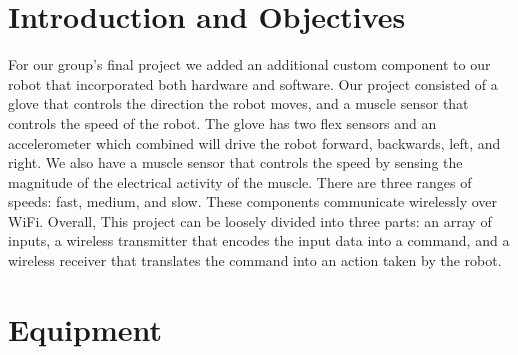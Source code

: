 \documentclass[12pt,scrartcl,titlepage]{article}
\begin{document}
\cfoot{\thepage}

{  }

\tableofcontents

\pagebreak


\section{Introduction and Objectives}

For our group's final project we added an additional custom component to our robot that incorporated both hardware and software. Our project consisted of a glove that controls  the direction the robot moves, and a muscle sensor that controls the speed of the robot. The glove has two flex sensors and an accelerometer which combined will drive the robot forward, backwards, left, and right. We also have a muscle sensor that controls the speed by sensing the magnitude of the electrical activity of the muscle. There are three ranges of speeds: fast, medium, and slow. These components communicate wirelessly over WiFi. Overall, This project can be loosely divided into three parts: an array of inputs, a wireless transmitter that encodes the input data into a command, and a wireless receiver that translates the command into an action taken by the robot.

\section{Equipment}
\end{document}
